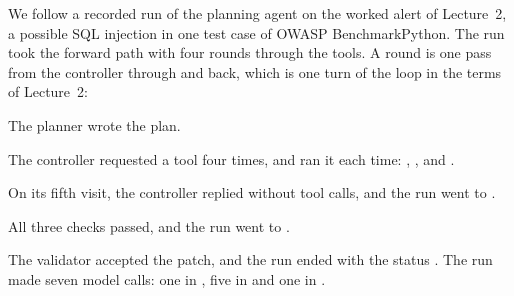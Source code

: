 We follow a recorded run of the planning agent on the worked alert of Lecture~2, a possible SQL
injection in one test case of OWASP BenchmarkPython. The run took the forward path with four rounds
through the tools. A round is one pass from the controller through  and back, which
is one turn of the loop in the terms of Lecture~2:
\be
\item The planner wrote the plan.
\item The controller requested a tool four times, and  ran it each time:
, ,  and .
\item On its fifth visit, the controller replied without tool calls, and the run went to
.
\item All three checks passed, and the run went to .
\item The validator accepted the patch, and the run ended with the status .
\ee
The run made seven model calls: one in , five in  and one in
.

